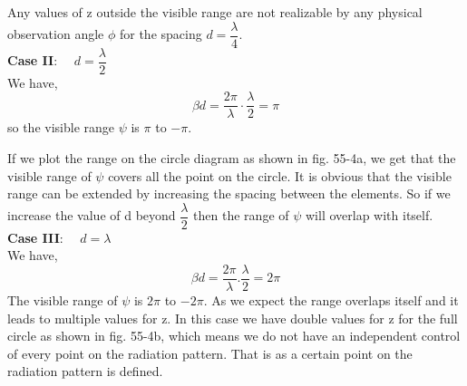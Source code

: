 Any values of z outside the visible range are not realizable by any physical observation angle $\phi$ for the spacing $d=\dfrac{\lambda}{4}$.\\
\textbf{Case II}: $\quad d=\dfrac{\lambda}{2}$\\
We have, $$\beta d=\dfrac{2\pi}{\lambda}\cdot \frac{\lambda}{2} = \pi$$
so the visible range $\psi$ is $\pi$ to $-\pi$.

If we plot the range on the circle diagram as shown in fig. 55-4a, we get that the visible range of $\psi$ covers all the point on the circle. It is obvious that the visible range can be extended by increasing the spacing between the elements. So if we increase the value of d beyond $\dfrac{\lambda}{2}$ then the range of $\psi$ will overlap with itself.\\
\textbf{Case III}: $\quad d=\lambda$\\
We have, $$\beta d=\dfrac{2\pi}{\lambda}.\dfrac{\lambda}{2} = 2\pi$$
The visible range of $\psi$ is $2\pi$ to $-2\pi$. As we expect the range overlaps itself and it leads to multiple values for z. In this case we have double values for z for the full circle as shown in fig. 55-4b, which means we do not have an independent control of every point on the radiation pattern. That is as a certain point on the radiation pattern is defined.
